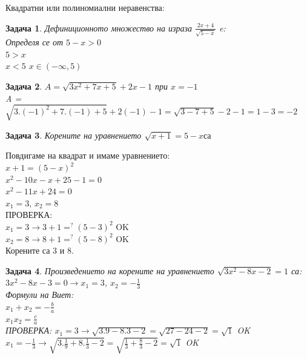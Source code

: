 \documentclass{article}
\newtheorem{problem}{Задача}
\begin{document}
	 Квадратни или полиномиални неравенства:
	 
	 
	\begin{problem}
		Дефиниционното множество на израза $\frac{2x+4}{\sqrt{5-x}} $ e: \\
		Определя се от $5-x > 0 $ \\
		 $ 5 > x  $\\
		  $x < 5  $ 
		$x \in \left( -\infty , 5 \right) $
	\end{problem}
	
	
	\begin{problem}
		$A = \sqrt{3x^2 + 7x + 5}+2x -1$ при $x =-1	  $ \\
		A = $\sqrt {3.(-1)^2 + 7.(-1) +5 } +2(-1) -1 = \sqrt{3 -7 +5} - 2 - 1 = 1 -3 = -2$
	\end{problem}
	
	\begin{problem}
		Корените на уравнението  $\sqrt {x +1} = 5-x са  $
	\end{problem}
	Повдигаме на квадрат и имаме уравнението: \\
	$x + 1 =  (5-x)^2 $ \\
	
	$x^2 -10x -x + 25 -1 = 0 $ \\
	$x^2 -11x + 24 = 0 $ \\
	$x_1 = 3 $, $x_2 = 8 $ \\
	
	ПРОВЕРКА:\\
	$x_1 = 3 \to 3+1 =^? (5-3)^2  $ OK \\
	$x_2 = 8 \to 8+1 =^? (5-8)^2 $ OK \\
	Корените са $3 $ и $8$.
	
	\begin{problem}
		Произведението на корените на уравнението $\sqrt{3x^2 - 8x - 2} = 1  $ са:  \\
		$3x^2 - 8x - 3 = 0 \to x_1 = 3$, $ x_2 = -\frac{1}{3} $ \\
		Формули на Виет: \\
		 $x_1 + x_2 = -\frac{b}{a}$  \\
		 $x_1x_2 = \frac{c}{a} $ \\
		 
		 ПРОВЕРКА:
		 $x_1 =3 \to \sqrt{3.9 - 8.3 -2} = \sqrt{27-24-2} = \sqrt{1} $ OK \\
		 
		 $x_1 =-\frac{1}{3} \to \sqrt{3.\frac{1}{9} + 8.\frac{1}{3}   -2} = \sqrt{\frac{1}{3} + \frac{8}{3} - 2} = \sqrt{1} $ OK
		 
	\end{problem}
	
\end{document}
